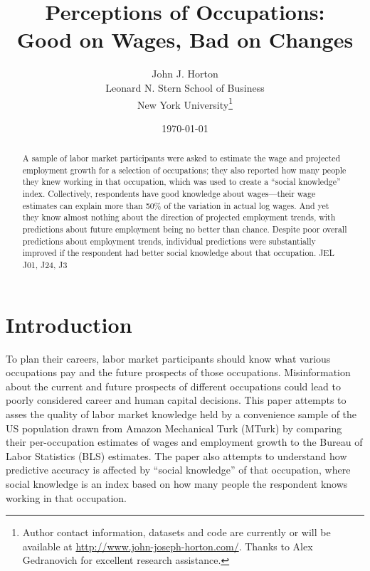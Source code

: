 \documentclass[12pt]{article}
\begin{document}
 

\title{Perceptions of Occupations: \\ Good on Wages, Bad on Changes}

\date{\today}

\author{John J. Horton \\ Leonard N. Stern School of Business \\ New
  York University\footnote{Author contact information, datasets and
    code are currently or will be available at
    \href{http://www.john-joseph-horton.com/}{http://www.john-joseph-horton.com/}. 
    Thanks to Alex Gedranovich for excellent research assistance. 
} }
\maketitle

\begin{abstract}
\noindent  
A sample of labor market participants were asked to estimate the wage and projected employment growth for a selection of occupations;
they also reported how many people they knew working in that occupation, which was used to create a ``social knowledge'' index. 
Collectively, respondents have good knowledge about wages---their wage estimates can explain more than 50\% of the variation in actual log wages.
And yet they know almost nothing about the direction of projected employment trends, with predictions about future employment being no better than chance. 
Despite poor overall predictions about employment trends, individual predictions were substantially improved if the respondent had better social knowledge about that occupation.
\newline 
\newline 
\noindent JEL J01, J24, J3
\end{abstract} 


\section{Introduction}
To plan their careers, labor market participants should know what various occupations pay and the future prospects of those occupations. 
Misinformation about the current and future prospects of different occupations could lead to poorly considered career and human capital decisions. 
This paper attempts to asses the quality of labor market knowledge
held by a convenience sample of the US population drawn from Amazon Mechanical Turk (MTurk) by comparing their per-occupation estimates of wages and employment growth to the Bureau of Labor Statistics (BLS) estimates. 
The paper also attempts to understand how predictive accuracy is affected by ``social knowledge'' of that occupation, where social knowledge is an index based on how many people the respondent knows working in that occupation.
\end{document}

